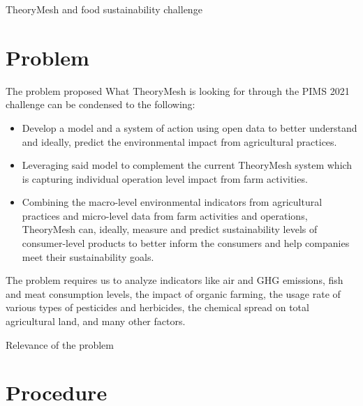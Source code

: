 \documentclass[t,9pt,aspectratio=169]{beamer}
\newcommand{\mydarkgreen}[1]{{\color{JungleGreen}#1}}
\begin{document}
\begin{frame}{TheoryMesh and food sustainability challenge}



 
\end{frame}

\section{Problem}
\begin{frame}{The problem proposed}
	What TheoryMesh is looking for through the PIMS 2021 challenge can be condensed to the following: 
	\begin{itemize}
		\item Develop a model and a system of action using open data to better understand and ideally, predict the environmental impact from agricultural practices.
		\item Leveraging said model to complement the current TheoryMesh system which is capturing individual operation level impact from farm activities. 
		\item Combining the macro-level environmental indicators from agricultural practices and micro-level data from farm activities and operations, TheoryMesh can, ideally, measure and predict sustainability levels of consumer-level products to better inform the consumers and help companies meet their sustainability goals.
	\end{itemize}

The problem requires us to analyze indicators like air and GHG emissions, fish and meat consumption levels, the impact of organic farming, the usage rate of various types of pesticides and herbicides, the chemical spread on total agricultural land, and many other factors. 

\begin{block}{Relevance of the problem}
 
\end{block}
\end{frame}

\section{Procedure}
\end{document}

